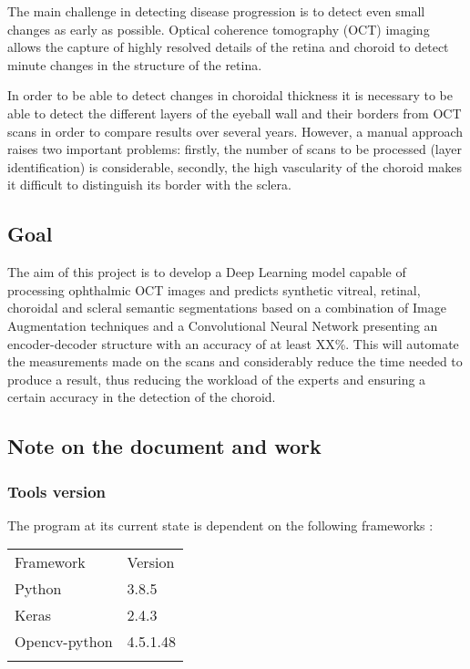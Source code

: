 \documentclass[12pt,a4paper]{scrartcl}
\begin{document}
The main challenge in detecting disease progression is to detect even small changes as early as possible. Optical coherence tomography (OCT) imaging allows the capture of highly resolved details of the retina and choroid to detect minute changes in the structure of the retina.\cite{ronchetti2019}

In order to be able to detect changes in choroidal thickness it is necessary to be able to detect the different layers of the eyeball wall and their borders from OCT scans in order to compare results over several years. 
However, a manual approach raises two important problems: firstly, the number of scans to be processed (layer identification) is considerable, secondly, the high vascularity of the choroid makes it difficult to distinguish its border with the sclera.

\subsection{Goal}
The aim of this project is to develop a Deep Learning model capable of processing  ophthalmic  OCT  images  and predicts  synthetic  vitreal,  retinal,  choroidal  and  scleral  semantic  segmentations  based  on  a  combination  of  Image  Augmentation  techniques  and  a Convolutional Neural Network presenting an encoder-decoder structure with an accuracy of at least XX\%. This will automate the measurements made on the scans and considerably reduce the time needed to produce a result, thus reducing the workload of the experts and ensuring a certain accuracy in the detection of the choroid. 

\subsection{Note on the document and work}
\subsubsection{Tools version}
The program at its current state is dependent on the following frameworks : 
    
    \begin{table}[H]
    \begin{tabular}{ll}
    Framework & Version \\
    Python & 3.8.5 \\
    Keras     & 2.4.3   \\
    Opencv-python  &   4.5.1.48 \\
    
              &        
    \end{tabular}
    \end{table}
\end{document}
